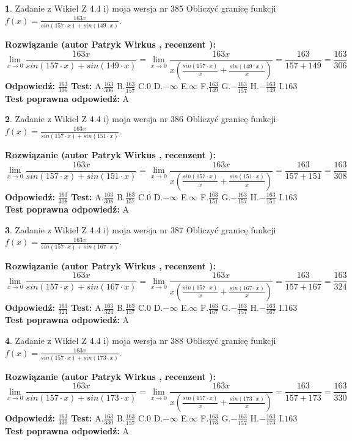 \documentclass[12pt, a4paper]{article}
\theoremstyle{definition} %
\newtheorem{zad}{}
\newcommand{\zadStart}[1]{\begin{zad}#1\newline}
\newcommand{\zadStop}{\end{zad}}
\newcommand{\rozwStart}[2]{\noindent \textbf{Rozwiązanie (autor #1 , recenzent #2): }\newline}
\newcommand{\rozwStop}{\newline}
\newcommand{\odpStart}{\noindent \textbf{Odpowiedź:}\newline}
\newcommand{\odpStop}{\newline}
\newcommand{\testStart}{\noindent \textbf{Test:}\newline}
\newcommand{\testStop}{\newline}
\newcommand{\kluczStart}{\noindent \textbf{Test poprawna odpowiedź:}\newline}
\newcommand{\kluczStop}{\newline}
\begin{document}
\zadStart{Zadanie z Wikieł Z 4.4 i) moja wersja nr 385}
Obliczyć granicę funkcji $f(x)=\frac{163x}{sin(157\cdot x) +sin(149\cdot x)}$.
\zadStop
\rozwStart{Patryk Wirkus}{}
$$\lim\limits_{x\to 0}\frac{163x}{sin(157\cdot x) +sin(149\cdot x)}=\lim\limits_{x\to 0}\frac{163x}{x(\frac{sin(157\cdot x)}{x}+\frac{sin(149\cdot x)}{x})}=\frac{163}{157+149} = \frac{163}{306}$$
\rozwStop
\odpStart
$\frac{163}{306}$
\odpStop
\testStart
A.$\frac{163}{306}$
B.$\frac{163}{157}$
C.$0$
D.$-\infty$
E.$\infty$
F.$\frac{163}{149}$
G.$-\frac{163}{157}$
H.$-\frac{163}{149}$
I.$163$
\testStop
\kluczStart
A
\kluczStop



\zadStart{Zadanie z Wikieł Z 4.4 i) moja wersja nr 386}
Obliczyć granicę funkcji $f(x)=\frac{163x}{sin(157\cdot x) +sin(151\cdot x)}$.
\zadStop
\rozwStart{Patryk Wirkus}{}
$$\lim\limits_{x\to 0}\frac{163x}{sin(157\cdot x) +sin(151\cdot x)}=\lim\limits_{x\to 0}\frac{163x}{x(\frac{sin(157\cdot x)}{x}+\frac{sin(151\cdot x)}{x})}=\frac{163}{157+151} = \frac{163}{308}$$
\rozwStop
\odpStart
$\frac{163}{308}$
\odpStop
\testStart
A.$\frac{163}{308}$
B.$\frac{163}{157}$
C.$0$
D.$-\infty$
E.$\infty$
F.$\frac{163}{151}$
G.$-\frac{163}{157}$
H.$-\frac{163}{151}$
I.$163$
\testStop
\kluczStart
A
\kluczStop



\zadStart{Zadanie z Wikieł Z 4.4 i) moja wersja nr 387}
Obliczyć granicę funkcji $f(x)=\frac{163x}{sin(157\cdot x) +sin(167\cdot x)}$.
\zadStop
\rozwStart{Patryk Wirkus}{}
$$\lim\limits_{x\to 0}\frac{163x}{sin(157\cdot x) +sin(167\cdot x)}=\lim\limits_{x\to 0}\frac{163x}{x(\frac{sin(157\cdot x)}{x}+\frac{sin(167\cdot x)}{x})}=\frac{163}{157+167} = \frac{163}{324}$$
\rozwStop
\odpStart
$\frac{163}{324}$
\odpStop
\testStart
A.$\frac{163}{324}$
B.$\frac{163}{157}$
C.$0$
D.$-\infty$
E.$\infty$
F.$\frac{163}{167}$
G.$-\frac{163}{157}$
H.$-\frac{163}{167}$
I.$163$
\testStop
\kluczStart
A
\kluczStop



\zadStart{Zadanie z Wikieł Z 4.4 i) moja wersja nr 388}
Obliczyć granicę funkcji $f(x)=\frac{163x}{sin(157\cdot x) +sin(173\cdot x)}$.
\zadStop
\rozwStart{Patryk Wirkus}{}
$$\lim\limits_{x\to 0}\frac{163x}{sin(157\cdot x) +sin(173\cdot x)}=\lim\limits_{x\to 0}\frac{163x}{x(\frac{sin(157\cdot x)}{x}+\frac{sin(173\cdot x)}{x})}=\frac{163}{157+173} = \frac{163}{330}$$
\rozwStop
\odpStart
$\frac{163}{330}$
\odpStop
\testStart
A.$\frac{163}{330}$
B.$\frac{163}{157}$
C.$0$
D.$-\infty$
E.$\infty$
F.$\frac{163}{173}$
G.$-\frac{163}{157}$
H.$-\frac{163}{173}$
I.$163$
\testStop
\kluczStart
A
\kluczStop
\end{document}
